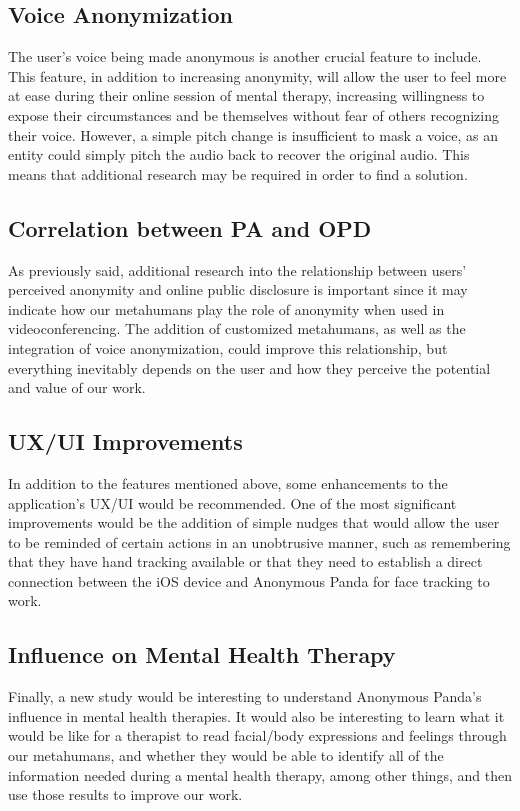 \subsection{Voice Anonymization}
The user's voice being made anonymous is another crucial feature to include. This feature, in addition to increasing anonymity, will allow the user to feel more at ease during their online session of mental therapy, increasing willingness to expose their circumstances and be themselves without fear of others recognizing their voice. However, a simple pitch change is insufficient to mask a voice, as an entity could simply pitch the audio back to recover the original audio. This means that additional research may be required in order to find a solution.

\subsection{Correlation between PA and OPD}
As previously said, additional research into the relationship between users' perceived anonymity and online public disclosure is important since it may indicate how our metahumans play the role of anonymity when used in videoconferencing. The addition of customized metahumans, as well as the integration of voice anonymization, could improve this relationship, but everything inevitably depends on the user and how they perceive the potential and value of our work.

\subsection{UX/UI Improvements}
In addition to the features mentioned above, some enhancements to the application's UX/UI would be recommended. One of the most significant improvements would be the addition of simple nudges that would allow the user to be reminded of certain actions in an unobtrusive manner, such as remembering that they have hand tracking available or that they need to establish a direct connection between the iOS device and Anonymous Panda for face tracking to work.

\subsection{Influence on Mental Health Therapy}
Finally, a new study would be interesting to understand Anonymous Panda's influence in mental health therapies. It would also be interesting to learn what it would be like for a therapist to read facial/body expressions and feelings through our metahumans, and whether they would be able to identify all of the information needed during a mental health therapy, among other things, and then use those results to improve our work.